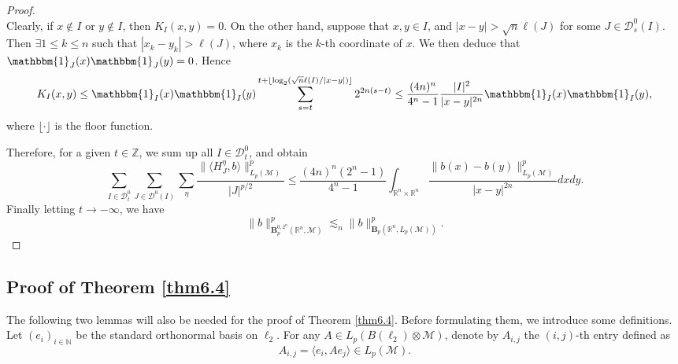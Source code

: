 \documentclass[oneside,english,a4wide]{amsart}
\numberwithin{equation}{section}
\numberwithin{figure}{section}
\theoremstyle{plain}
\theoremstyle{plain}
\theoremstyle{definition}
\theoremstyle{plain}
\theoremstyle{remark}
\theoremstyle{definition}
\theoremstyle{remark}
\theoremstyle{definition}
\newcommand{\M}{{\mathcal M}}
\newcommand{\8}{\infty}
\newcommand{\la}{\langle}
\newcommand{\ra}{\rangle}
\begin{document}
\begin{proof}
\begin{equation*}
	\end{equation*}
	Clearly,  if $x\notin I$ or $y\notin I$, then $K_I(x,y)=0$. On the other hand, suppose that $x,y\in I$, and $|x-y|>\sqrt{n}\ell(J)$ for some $J\in \mathcal{D}^0_s(I)$. Then $\exists 1\le k\le n$ such that $|x_k-y_k|>\ell(J)$, where $x_k$ is the $k$-th coordinate of $x$. We then deduce that $\mathbbm{1}_J(x)\mathbbm{1}_J(y)=0$. Hence
	\begin{equation*}
		K_I(x,y)\le \mathbbm{1}_I(x)\mathbbm{1}_I(y)\sum_{s=t}^{t+\lfloor\log_2(\sqrt{n}\ell(I)/|x-y|)\rfloor}2^{2n(s-t)}\le \frac{(4n)^n}{4^n-1}\frac{|I|^2}{|x-y|^{2n}}\mathbbm{1}_I(x)\mathbbm{1}_I(y),
	\end{equation*}
	where $\lfloor\cdot\rfloor$ is the floor function.
	
	Therefore, for a given $t\in\mathbb{Z}$, we sum up all $I\in \mathcal{ D}^0_t$, and obtain
	\begin{equation*}
		\sum_{I\in\mathcal{D}^0_t}\sum_{J\in\mathcal{D}^0(I)}\sum_{\eta}\frac{\|\langle H_J^\eta,b\rangle\|_{L_p(\mathcal{M})}^p}{|J|^{p/2}}\le\frac{(4n)^n(2^n-1)}{4^n-1}\int_{\mathbb{R}^n\times\mathbb{R}^n}\frac{\|b(x)-b(y)\|_{L_p(\mathcal{M})}^p}{|x-y|^{2n}}dxdy.
	\end{equation*}
	Finally letting $t\to -\infty$, we have
	\begin{equation*}
		\|b\|^p_{\pmb{B}_p^{0, 2^n}(\mathbb{R}^n,\mathcal{M})}\lesssim_{n}\|b\|^p_{\pmb{B}_p(\mathbb{R}^n,L_p(\mathcal{M}))}.
	\end{equation*}
	
	
\end{proof}	

\subsection{Proof of Theorem \ref{thm6.4}}
The following two lemmas will also be needed for the proof of Theorem \ref{thm6.4}. Before formulating them, we introduce some definitions. Let $(e_i)_{i\in \mathbb{N}}$ be the standard orthonormal basis on $\ell_2$. For any $A\in L_p(B(\ell_2)\otimes \mathcal{M})$, denote by $A_{i, j}$ the $(i, j)$-th entry defined as
$$ A_{i, j}= \la e_i, A e_j\ra\in L_p(\M).  $$
\end{document}
